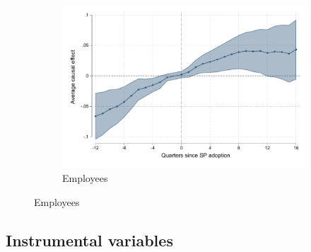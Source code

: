 \begin{figure}[H]
\begin{center}
        \begin{subfigure}{0.325\textwidth}
    \caption{Employees}
        \includegraphics[width=\textwidth]{Figuras/did_event_flex_e_t.pdf}
    \end{subfigure}
  
  \end{center}
    \scriptsize 

\end{figure}


\newpage

\subsection{Instrumental variables}


